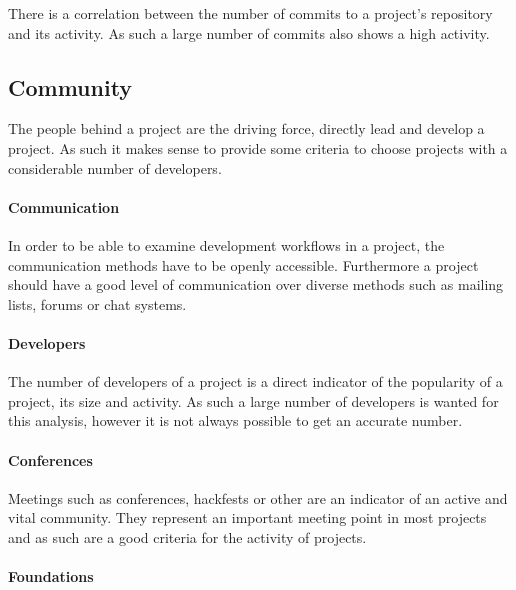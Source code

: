 There is a correlation between the number of commits to a project's repository
and its activity. As such a large number of commits also shows a high activity.



\subsection{Community} %

The people behind a project are the driving force, directly lead and develop
a project. As such it makes sense to provide some criteria to choose projects
with a considerable number of developers.

\paragraph{Communication} %

In order to be able to examine development workflows in a project,
the communication methods have to be openly accessible. Furthermore a project
should have a good level of communication over diverse methods such as mailing
lists, forums or chat systems.


\paragraph{Developers} %

The number of developers of a project is a direct indicator of the popularity
of a project, its size and activity. As such a large number of developers is
wanted for this analysis, however it is not always possible to get an accurate
number.


\paragraph{Conferences} %

Meetings such as conferences, hackfests or other are an indicator of an active
and vital community. They represent an important meeting point in most projects
and as such are a good criteria for the activity of projects.


\paragraph{Foundations} %


